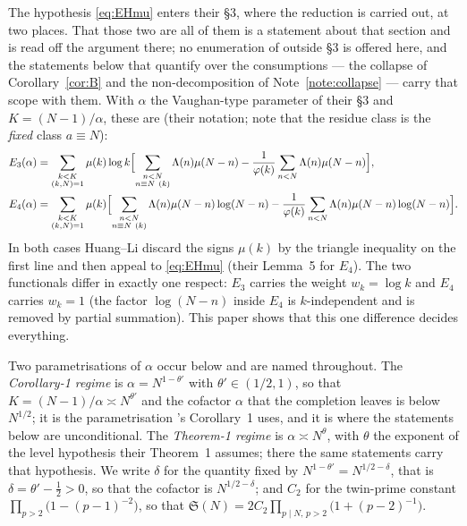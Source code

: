 \documentclass[11pt,a4paper]{article}
\theoremstyle{plain}
\theoremstyle{definition}
\theoremstyle{remark}
\renewcommand{\SS}{\mathfrak{S}}
\begin{document}
The hypothesis \eqref{eq:EHmu} enters their \S3, where the reduction
is carried out, at two places. That those two are all of them is a
statement about that section and is read off the argument there; no
enumeration of \cite{HL} outside \S3 is offered here, and the
statements below that quantify over the consumptions --- the collapse
of Corollary~\ref{cor:B} and the non-decomposition of
Note~\ref{note:collapse} --- carry that scope with them.
With $\alpha$ the Vaughan-type parameter of their \S3 and
$K=(N-1)/\alpha$, these are (their notation; note that the residue
class is the \emph{fixed} class $a\equiv N$):
\begin{align}
  E_3(\alpha) &= \sum_{\substack{k<K\\ (k,N)=1}}\mu(k)\log k
    \Bigl[\sum_{\substack{n<N\\ n\equiv N\ (k)}}\Lambda(n)\mu(N-n)
      -\frac{1}{\varphi(k)}\sum_{n<N}\Lambda(n)\mu(N-n)\Bigr],
      \label{eq:E3}\\
  E_4(\alpha) &= \sum_{\substack{k<K\\ (k,N)=1}}\mu(k)
    \Bigl[\sum_{\substack{n<N\\ n\equiv N\ (k)}}\Lambda(n)\mu(N-n)\log(N-n)
      -\frac{1}{\varphi(k)}\sum_{n<N}\Lambda(n)\mu(N-n)\log(N-n)\Bigr].
      \label{eq:E4}
\end{align}
In both cases Huang--Li discard the signs $\mu(k)$ by the triangle
inequality on the first line and then appeal to \eqref{eq:EHmu} (their
Lemma~5 for $E_4$). The two functionals differ in exactly one respect:
$E_3$ carries the weight $w_k=\log k$ and $E_4$ carries $w_k=1$ (the
factor $\log(N-n)$ inside $E_4$ is $k$-independent and is removed by
partial summation). This paper shows that this one difference decides
everything.

Two parametrisations of $\alpha$ occur below and are named throughout.
The \emph{Corollary-1 regime} is $\alpha=N^{1-\theta'}$ with
$\theta'\in(1/2,1)$, so that $K=(N-1)/\alpha\asymp N^{\theta'}$ and the
cofactor $\alpha$ that the completion leaves is below $N^{1/2}$; it is
the parametrisation \cite{HL}'s Corollary~1 uses, and it is where the
statements below are unconditional. The \emph{Theorem-1 regime} is
$\alpha\asymp N^{\theta}$, with $\theta$ the exponent of the level
hypothesis their Theorem~1 assumes; there the same statements carry
that hypothesis. We write $\delta$ for the quantity fixed by
$N^{1-\theta'}=N^{1/2-\delta}$, that is $\delta=\theta'-\tfrac12>0$,
so that the cofactor is $N^{1/2-\delta}$; and $C_2$ for the twin-prime
constant $\prod_{p>2}\bigl(1-(p-1)^{-2}\bigr)$, so that
$\SS(N)=2C_2\prod_{p\mid N,\,p>2}\bigl(1+(p-2)^{-1}\bigr)$.
\end{document}
